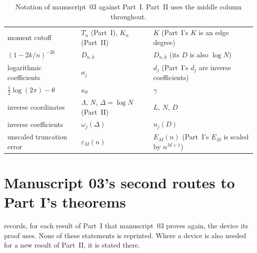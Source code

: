 \documentclass[11pt]{article}
\numberwithin{equation}{section}
\theoremstyle{definition}
\theoremstyle{remark}
\theoremstyle{definition}
\begin{document}
\begin{table}[htbp]
\begin{tabular}{@{}>{\raggedright\arraybackslash}p{}>{\raggedright\arraybackslash}p{}>{\raggedright\arraybackslash}p{}@{}}
moment cutoff & $T_n$ (Part~I), $K_n$ (Part~II) & $K$ (Part~I's $K$ is an edge degree)\\
$(1-2k/n)^{-2k}$ & $D_{n,k}$ & $D_{n,k}$ (its $D$ is also $\log N$)\\
logarithmic coefficients & $a_j$ & $d_j$ (Part~I's $d_j$ are inverse coefficients)\\
$\tfrac12\log(2\pi)-\theta$ & $\kappa_\theta$ & $\gamma$\\
inverse coordinates & $\Lambda$, $N$, $\Delta=\log N$ (Part~II) & $L$, $N$, $D$\\
inverse coefficients & $\omega_j(\Delta)$ & $u_j(D)$\\
unscaled truncation error & $\varepsilon_M(n)$ & $E_M(n)$ (Part~I's $E_M$ is scaled by $n^{M+1}$)\\
\bottomrule
\end{tabular}
\caption{Notation of manuscript~03 against Part~I. Part~II uses the middle
column throughout.}
\label{fga:tab:dictionary}
\end{table}

\section{Manuscript 03's second routes to Part I's theorems}
\label{fga:sec:routes}

 records, for each result of Part~I that
manuscript~03 proves again, the device its proof uses. None of these
statements is reprinted. Where a device is also needed for a new result
of Part~II, it is stated there.
\end{document}

